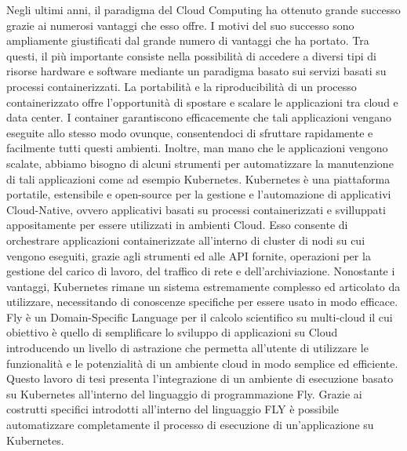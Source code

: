 Negli ultimi anni, il paradigma del Cloud Computing ha ottenuto grande successo grazie ai numerosi vantaggi che esso offre.
I motivi del suo successo sono ampliamente giustificati dal grande numero di vantaggi che ha portato. 
Tra questi, il più importante consiste nella possibilità di accedere a diversi tipi di risorse hardware e software mediante un paradigma
basato sui servizi basati su processi containerizzati.
La portabilità e la riproducibilità di un processo containerizzato offre l'opportunità di spostare e scalare le applicazioni tra cloud e data center. 
I container garantiscono efficacemente che tali applicazioni vengano eseguite allo stesso modo ovunque, consentendoci di sfruttare rapidamente e facilmente tutti questi ambienti.
Inoltre, man mano che le applicazioni vengono scalate, abbiamo bisogno di alcuni strumenti per automatizzare la manutenzione di tali applicazioni come ad esempio Kubernetes.
Kubernetes è una piattaforma portatile, estensibile e open-source per la gestione e l'automazione di applicativi Cloud-Native,
ovvero applicativi basati su processi containerizzati e svilluppati appositamente per essere utilizzati in ambienti Cloud. 
Esso consente di orchestrare applicazioni containerizzate all'interno di cluster di nodi su cui vengono eseguiti, grazie agli strumenti ed alle API fornite, operazioni per la gestione del carico di lavoro, 
del traffico di rete e dell'archiviazione. 
Nonostante i vantaggi, Kubernetes rimane un sistema estremamente complesso ed articolato da utilizzare, necessitando di conoscenze specifiche per essere usato in modo efficace.
Fly è un Domain-Specific Language per il calcolo scientifico su multi-cloud il cui obiettivo è quello di semplificare lo sviluppo di applicazioni su Cloud introducendo un livello di astrazione
che permetta all'utente di utilizzare le funzionalità e le potenzialità di un ambiente cloud in modo semplice ed efficiente. 
Questo lavoro di tesi presenta l'integrazione di un ambiente di esecuzione basato su Kubernetes all'interno del linguaggio di programmazione Fly. 
Grazie ai costrutti specifici introdotti all'interno del linguaggio FLY è possibile automatizzare completamente il processo di esecuzione di un'applicazione su Kubernetes.